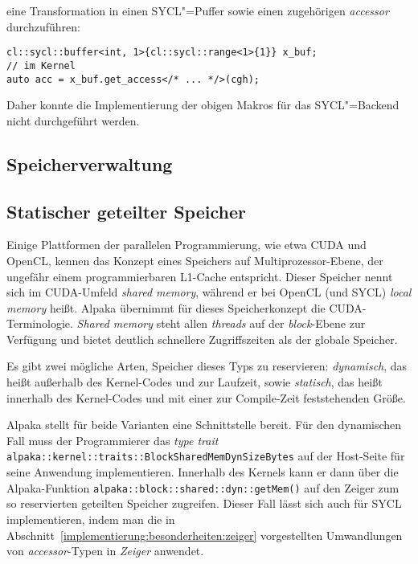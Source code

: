 eine Transformation in einen SYCL"=Puffer sowie einen zugehörigen
\textit{accessor} durchzuführen:

\begin{code}
    \begin{verbatim}
cl::sycl::buffer<int, 1>{cl::sycl::range<1>{1}} x_buf;
// im Kernel
auto acc = x_buf.get_access</* ... */>(cgh);
    \end{verbatim}
\end{code}

Daher konnte die Implementierung der obigen Makros für das SYCL"=Backend nicht
durchgeführt werden.

\subsection{Speicherverwaltung}\label{implementierung:probleme:speicher}

\subsection{Statischer geteilter Speicher}
\label{implementierung:probleme:shared}

Einige Plattformen der parallelen Programmierung, wie etwa CUDA und OpenCL,
kennen das Konzept eines Speichers auf Multiprozessor-Ebene, der ungefähr
einem programmierbaren L1-Cache entspricht. Dieser Speicher nennt sich im
CUDA-Umfeld \textit{shared memory}, während er bei OpenCL (und SYCL)
\textit{local memory} heißt. Alpaka übernimmt für dieses Speicherkonzept die
CUDA-Terminologie. \textit{Shared memory} steht allen \textit{threads} auf
der \textit{block}-Ebene zur Verfügung und bietet deutlich schnellere
Zugriffszeiten als der globale Speicher.

Es gibt zwei mögliche Arten, Speicher dieses Typs zu reservieren:
\textit{dynamisch}, das heißt außerhalb des Kernel-Codes und zur Laufzeit, sowie
\textit{statisch}, das heißt innerhalb des Kernel-Codes und mit einer zur
Compile-Zeit feststehenden Größe.

Alpaka stellt für beide Varianten eine Schnittstelle bereit. Für den dynamischen
Fall muss der Programmierer das \textit{type trait}
\texttt{alpaka::kernel::traits::BlockSharedMemDynSizeBytes} auf der Host-Seite
für seine Anwendung implementieren. Innerhalb des Kernels kann er dann über die
Alpaka-Funktion \texttt{alpaka::block::shared::dyn::getMem()} auf den Zeiger
zum so reservierten geteilten Speicher zugreifen. Dieser Fall lässt sich auch
für SYCL implementieren, indem man die in
Abschnitt~\ref{implementierung:besonderheiten:zeiger} vorgestellten
Umwandlungen von \textit{accessor}-Typen in \textit{Zeiger} anwendet.

